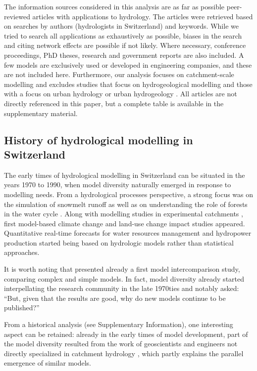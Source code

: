 \documentclass[10pt,a4paper]{article}
\begin{document}
The information sources considered in this analysis are as far as possible peer-reviewed articles with applications to hydrology. The articles were retrieved based on searches by authors (hydrologists in Switzerland) and keywords. While we tried to search all applications as exhaustively as possible, biases in the search and citing network effects are possible if not likely. Where necessary, conference proceedings, PhD theses, research and government reports are also included. A few models are exclusively used or developed in engineering companies, and these are not included here. Furthermore, our analysis focuses on catchment-scale modelling and excludes studies that focus on hydrogeological modelling \citep{Carlier2019} and those with a focus on urban hydrology \citep{Peleg2017} or urban hydrogeology \citep{schirmer2013}. All articles are not directly referenced in this paper, but a complete table is available in the supplementary material.


\subsection{History of hydrological modelling in Switzerland}
\label{sec:models:history}

The early times of hydrological modelling in Switzerland can be situated in the years 1970 to 1990, when model diversity naturally emerged in response to modelling needs. From a hydrological processes perspective, a strong focus was on the simulation of snowmelt runoff \citep{braun1986} as well as on understanding the role of forests in the water cycle \citep{keller1991,forster1989}. Along with modelling studies in experimental catchments \citep{Iorgulescu1994}, first model-based climate change \citep{bultot1992a} and land-use change \citep{jordan1990a} impact studies appeared. Quantitative real-time forecasts for water resources management \citep{p1969} and hydropower production \citep{jensenlang1973} started being based on hydrologic models rather than statistical approaches.

It is worth noting that \citet{naef1977} presented already a first model intercomparison study, comparing complex and simple models. In fact, model diversity already started interpellating the research community in the late 1970ties and \citet{f1981} notably asked: ``But, given that the results are good, why do new models continue to be published?'' 

From a historical analysis (see Supplementary Information), one interesting aspect can be retained: already in the early times of model development, part of the model diversity resulted from the work of geoscientists and engineers not directly specialized in catchment hydrology \citep{Abednego1990,k1986a,hager1984,sautier1980}, which partly explains the parallel emergence of similar models. 
\end{document}
